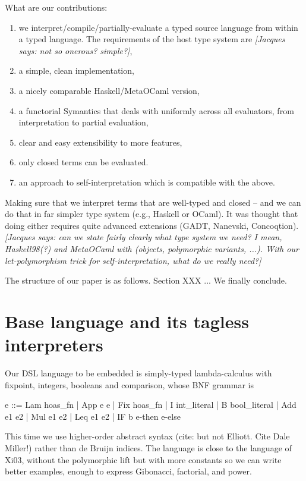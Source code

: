 \documentclass[preprint]{sigplanconf}
\newcommand{\jacques}[1]{{\it [Jacques says: #1]}}
\begin{document}
What are our contributions:
\begin{enumerate}
\item we interpret/compile/partially-evaluate a typed source language
   from within a typed language.  The requirements of the host type
   system are \jacques{not so onerous?  simple?},
\item a simple, clean implementation,
\item a nicely comparable Haskell/MetaOCaml version,
\item a functorial Symantics that deals with uniformly across all
evaluators, from interpretation to partial evaluation,
\item clear and easy extensibility to more features,
\item only closed terms can be evaluated.
\item an approach to self-interpretation which is compatible with the
  above.
\end{enumerate}

Making sure that we interpret terms that are well-typed and closed --
and we can do that in far simpler type system (e.g., Haskell or
OCaml). It was thought that doing either requires quite advanced
extensions (GADT, Nanevski, Concoqtion).
\jacques{can we state fairly clearly what type system we need?  I mean,
Haskell98(?) and MetaOCaml with (objects, polymorphic variants, ...).
With our let-polymorphism trick for self-interpretation, what do we really
need?}

The structure of our paper is as follows. Section XXX ...
We finally conclude.

\section{Base language and its tagless interpreters}\label{language}

Our DSL language to be embedded is simply-typed lambda-calculus
with fixpoint, integers, booleans and comparison, whose BNF grammar is

\begin{code}
  e ::= Lam hoas_fn | App e e | Fix hoas_fn |
  I int_literal | B bool_literal | Add e1 e2 | 
  Mul e1 e2 | Leq e1 e2 | IF b e-then e-else
\end{code}

This time we use higher-order abstract syntax (cite: but not
Elliott. Cite Dale Miller!) rather than de Bruijn indices.  The
language is close to the language of Xi03, without the polymorphic
lift but with more constants so we can write better examples, enough to
express Gibonacci, factorial, and power.
\end{document}
